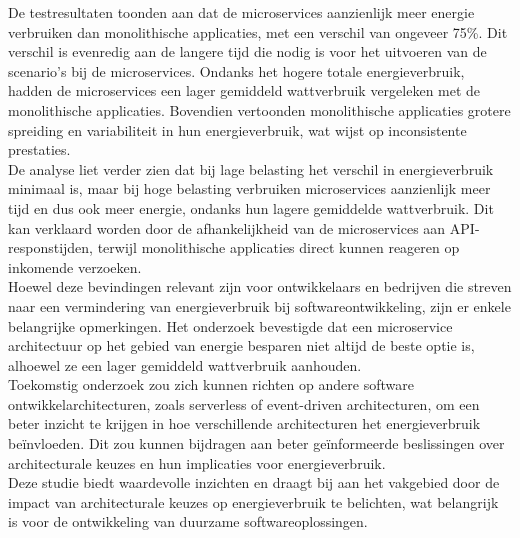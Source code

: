 De testresultaten toonden aan dat de microservices aanzienlijk meer energie verbruiken dan monolithische applicaties, met een verschil van ongeveer 75\%. Dit verschil is evenredig aan de langere tijd die nodig is voor het uitvoeren van de scenario’s bij de microservices. Ondanks het hogere totale energieverbruik, hadden de microservices een lager gemiddeld wattverbruik vergeleken met de monolithische applicaties. Bovendien vertoonden monolithische applicaties grotere spreiding en variabiliteit in hun energieverbruik, wat wijst op inconsistente prestaties.\\

De analyse liet verder zien dat bij lage belasting het verschil in energieverbruik minimaal is, maar bij hoge belasting verbruiken microservices aanzienlijk meer tijd en dus ook meer energie, ondanks hun lagere gemiddelde wattverbruik. Dit kan verklaard worden door de afhankelijkheid van de microservices aan API-responstijden, terwijl monolithische applicaties direct kunnen reageren op inkomende verzoeken.\\

Hoewel deze bevindingen relevant zijn voor ontwikkelaars en bedrijven die streven naar een vermindering van energieverbruik bij softwareontwikkeling, zijn er enkele belangrijke opmerkingen. Het onderzoek bevestigde dat een microservice architectuur op het gebied van energie besparen niet altijd de beste optie is, alhoewel ze een lager gemiddeld wattverbruik aanhouden.\\

Toekomstig onderzoek zou zich kunnen richten op andere software ontwikkelarchitecturen, zoals serverless of event-driven architecturen, om een beter inzicht te krijgen in hoe verschillende architecturen het energieverbruik beïnvloeden. Dit zou kunnen bijdragen aan beter geïnformeerde beslissingen over architecturale keuzes en hun implicaties voor energieverbruik.\\

Deze studie biedt waardevolle inzichten en draagt bij aan het vakgebied door de impact van architecturale keuzes op energieverbruik te belichten, wat belangrijk is voor de ontwikkeling van duurzame softwareoplossingen.